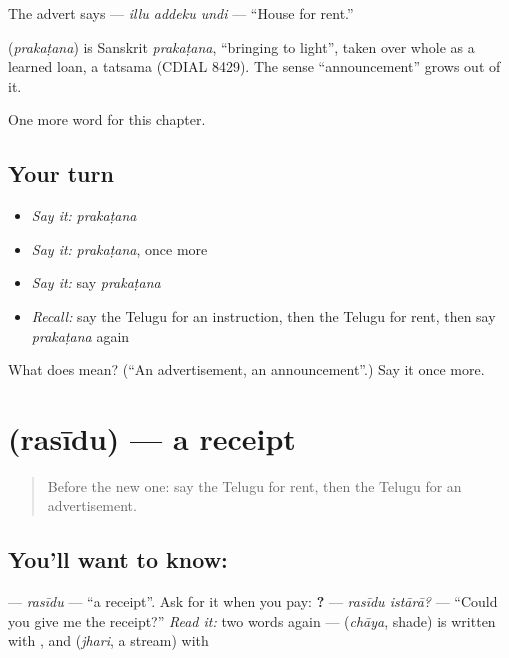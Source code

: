 The advert says \textbf{  } — \emph{illu addeku undi} — \textquotedblleft{}House for rent.\textquotedblright{}

\begin{cousinweb}
\textbf{} (\emph{prakaṭana}) is Sanskrit \emph{prakaṭana}, \textquotedblleft{}bringing to light\textquotedblright{}, taken over whole as a learned loan, a tatsama (CDIAL 8429). The sense \textquotedblleft{}announcement\textquotedblright{} grows out of it.
\end{cousinweb}

\begin{grammarlens}[title={What you've built}]
One more word for this chapter.
\end{grammarlens}

\subsection*{Your turn}
\begin{itemize}
\raggedright
  \item \emph{Say it:} \emph{prakaṭana}
  \item \emph{Say it:} \emph{prakaṭana}, once more
  \item \emph{Say it:} say \emph{prakaṭana}
  \item \emph{Recall:} say the Telugu for an instruction, then the Telugu for rent, then say \emph{prakaṭana} again
\end{itemize}

\begin{tcolorbox}[breakable,colback=teal!4,colframe=teal!35!black,title={Before you move on}]
What does  mean? (\textquotedblleft{}An advertisement, an announcement\textquotedblright{}.) Say it once more.
\end{tcolorbox}
\section[\texorpdfstring{\te{రసీదు} (rasīdu)}{రసీదు (rasīdu)}]{ (rasīdu) — a receipt}

\label{lesson:TE-C156-rasidu}



\begin{quote}
Before the new one: say the Telugu for rent, then the Telugu for an advertisement.
\end{quote}

\subsection*{You'll want to know: }
\textbf{} — \emph{rasīdu} — \textquotedblleft{}a receipt\textquotedblright{}. Ask for it when you pay: \textbf{ ?} — \emph{rasīdu istārā?} — \textquotedblleft{}Could you give me the receipt?\textquotedblright{} \emph{Read it:} two words again — \textbf{} (\emph{chāya}, shade) is written with , and \textbf{} (\emph{jhari}, a stream) with 

